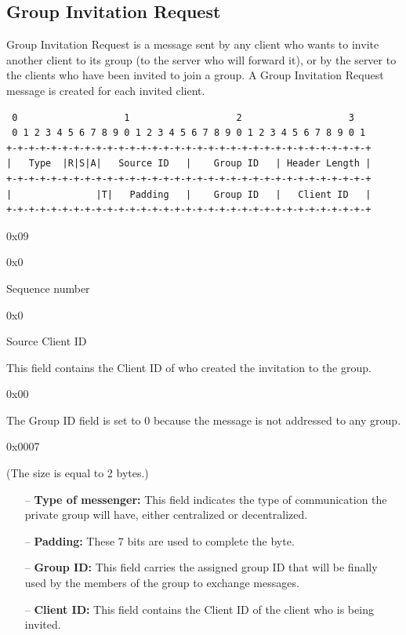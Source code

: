 \documentclass{article}
\begin{document}
\subsection{Group Invitation Request}
Group Invitation Request is a message sent by any client who wants to invite another client to its group (to the server who will forward it), or by the server to the clients who have been invited to join a group. A Group Invitation Request message is created for each invited client.
\begin{verbatim}  
 0                   1                   2                   3  
 0 1 2 3 4 5 6 7 8 9 0 1 2 3 4 5 6 7 8 9 0 1 2 3 4 5 6 7 8 9 0 1
+-+-+-+-+-+-+-+-+-+-+-+-+-+-+-+-+-+-+-+-+-+-+-+-+-+-+-+-+-+-+-+-+
|   Type  |R|S|A|   Source ID   |    Group ID   | Header Length |
+-+-+-+-+-+-+-+-+-+-+-+-+-+-+-+-+-+-+-+-+-+-+-+-+-+-+-+-+-+-+-+-+
|               |T|   Padding   |    Group ID   |   Client ID   |
+-+-+-+-+-+-+-+-+-+-+-+-+-+-+-+-+-+-+-+-+-+-+-+-+-+-+-+-+-+-+-+-+
\end{verbatim}
\begin{description}[align=left]
    \item [Type:] 0x09
    
    \item [Reserved:] 0x0
        
    \item [Sequence:] Sequence number
    
    \item [Acknowledgement:] 0x0
     
    \item [Source ID:] Source Client ID
    \begin{flushleft}
        This field contains the Client ID of who created the invitation to the group.  
    \end{flushleft}
    
    \item [Group ID:] 0x00
    \begin{flushleft}
        The Group ID field is set to 0 because the message is not addressed to any group.
    \end{flushleft}
    
    \item [Header Length:] 0x0007

    \item[Options:] (The size is equal to 2 bytes.)
    \begin{itemize}
        \item[--]\textbf{Type of messenger:} This field indicates the type of communication the private group will have, either centralized or decentralized.
        \item[--]\textbf{Padding:} These 7 bits are used to complete the byte.
        \item[--]\textbf{Group ID:} This field carries the assigned group ID that will be finally used by the members of the group to exchange messages.
        \item[--]\textbf{Client ID:} This field contains the Client ID of the client who is being invited.
    \end{itemize}
\end{description}
\end{document}
